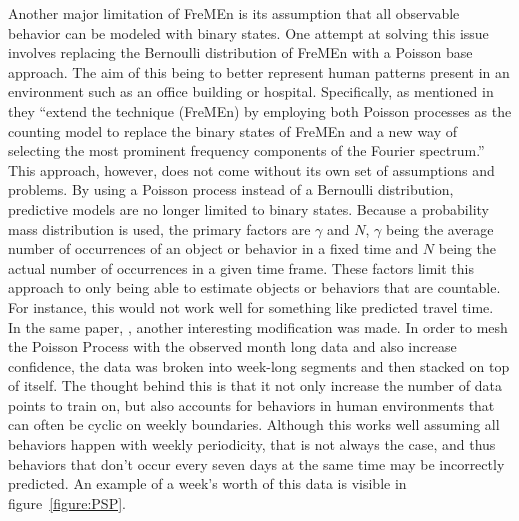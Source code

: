   Another major limitation of FreMEn is its assumption that all observable
  behavior can be modeled with binary states. One attempt at solving this issue
  involves replacing the Bernoulli distribution of FreMEn with a Poisson base approach.
  The aim of this being to
  better represent human patterns present in an environment such as
  an office building or hospital. Specifically, as mentioned in \cite{Jovan2016} they
  ``extend the technique (FreMEn) by employing both Poisson processes as the counting model to replace the binary states of FreMEn and a new way of selecting the most prominent frequency components of the Fourier spectrum.''
  This approach,
  however, does not come without its own set of assumptions and problems. By
  using a Poisson process instead of a Bernoulli distribution, predictive models are no longer
  limited to binary states. Because a probability mass distribution is used,
  the primary factors are $\gamma$ and $N$, $\gamma$ being the average number of
  occurrences of an object or behavior in a fixed time and $N$ being the actual
  number of occurrences in a given time frame. These factors limit this
  approach to only being able to estimate objects or behaviors that are
  countable. For instance, this would not work well for something like
  predicted travel time. \\

  In the same paper,
  \cite{Jovan2016}, another interesting modification was made. In order to mesh
  the Poisson Process with the observed month long data and also
  increase confidence, the data was broken into week-long segments and then
  stacked on top of itself. The thought behind this is that it not only
  increase the number of data points to train on, but also accounts for behaviors in human
  environments that can often be cyclic on weekly boundaries. Although this works well
  assuming all behaviors happen with weekly periodicity, that is not always
  the case, and thus behaviors that don't occur every seven days at the same time
  may be incorrectly predicted. An example of a week's worth of this data is visible
  in figure~\ref{figure:PSP}. \\

